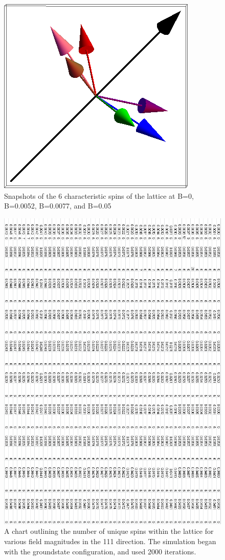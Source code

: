 \documentclass{article}
\begin{document}
\begin{figure}[ht]
\includegraphics[scale=0.3]{111_2000/4S000to005G.png}
\caption{Snapshots of the 6 characteristic spins of the lattice at B=0, B=0.0052, B=0.0077, and B=0.05}
\end{figure}
\clearpage

\begin{figure}[ht]
\centering
  \includegraphics[keepaspectratio,scale=0.52]{111_2000/000to005SpinChart.png}
  \caption{A chart outlining the number of unique spins within the lattice for various field magnitudes in the 111
  direction. The simulation began with the groundstate configuration, and used 2000 iterations.}
\end{figure}
\clearpage
\end{document}

